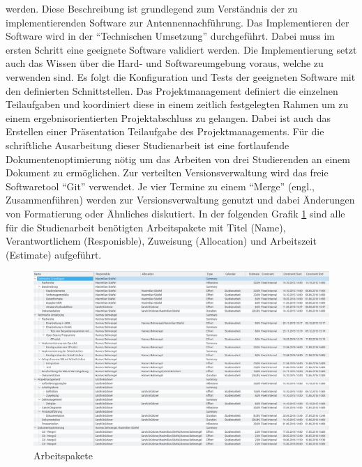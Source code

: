 werden. Diese Beschreibung ist grundlegend zum Verständnis der zu implementierenden Software 
zur Antennennachführung. Das Implementieren der Software wird in der ``Technischen Umsetzung'' 
durchgeführt. Dabei muss im ersten Schritt eine geeignete Software validiert werden. Die 
Implementierung setzt auch das Wissen über die Hard- und Softwareumgebung voraus, welche zu 
verwenden sind. Es folgt die Konfiguration und Tests der geeigneten Software mit den definierten 
Schnittstellen.
\newpar
Das Projektmanagement definiert die einzelnen Teilaufgaben und koordiniert diese in einem zeitlich 
festgelegten Rahmen um zu einem ergebnisorientierten Projektabschluss zu gelangen. Dabei ist auch 
das Erstellen einer Präsentation Teilaufgabe des Projektmanagements.
\newpar
Für die schriftliche Ausarbeitung dieser Studienarbeit ist eine fortlaufende Dokumentenoptimierung 
nötig um das Arbeiten von drei Studierenden an einem Dokument zu ermöglichen. Zur verteilten 
Versionsverwaltung wird das freie Softwaretool ``Git'' verwendet. Je vier Termine zu einem 
``Merge'' (engl., Zusammenführen) werden zur Versionsverwaltung genutzt und dabei Änderungen von 
Formatierung oder Ähnliches diskutiert.
\newpar
In der folgenden Grafik \ref{fig:arbeitspaket} sind alle für die Studienarbeit benötigten 
Arbeitspakete mit Titel (Name), Verantwortlichem (Responisble), Zuweisung (Allocation) und 
Arbeitszeit (Estimate) aufgeführt.
\begin{figure}[t]
 \centering
\includegraphics[width=1.0\linewidth]{./images/02depencies}
\caption{Arbeitspakete}
 \label{fig:arbeitspaket}
\end{figure}

